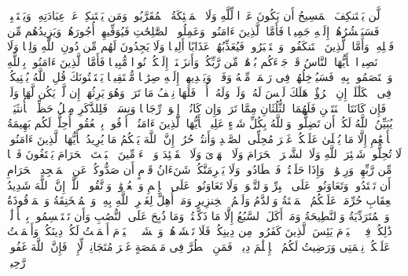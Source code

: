 \stopbuffer%
\startbuffer[\q:4:172]
لَّن یَسۡتَنكِفَ ٱلۡمَسِیحُ أَن یَكُونَ عَبۡدࣰا لِّلَّهِ وَلَا ٱلۡمَلَٰۤئِكَةُ ٱلۡمُقَرَّبُونَۚ وَمَن یَسۡتَنكِفۡ عَنۡ عِبَادَتِهِۦ وَیَسۡتَكۡبِرۡ فَسَیَحۡشُرُهُمۡ إِلَیۡهِ جَمِیعࣰا%
\stopbuffer%
\startbuffer[\q:4:173]
فَأَمَّا ٱلَّذِینَ ءَامَنُوا۟ وَعَمِلُوا۟ ٱلصَّٰلِحَٰتِ فَیُوَفِّیهِمۡ أُجُورَهُمۡ وَیَزِیدُهُم مِّن فَضۡلِهِۦۖ وَأَمَّا ٱلَّذِینَ ٱسۡتَنكَفُوا۟ وَٱسۡتَكۡبَرُوا۟ فَیُعَذِّبُهُمۡ عَذَابًا أَلِیمࣰا وَلَا یَجِدُونَ لَهُم مِّن دُونِ ٱللَّهِ وَلِیࣰّا وَلَا نَصِیرࣰا%
\stopbuffer%
\startbuffer[\q:4:174]
یَٰۤأَیُّهَا ٱلنَّاسُ قَدۡ جَاۤءَكُم بُرۡهَٰنࣱ مِّن رَّبِّكُمۡ وَأَنزَلۡنَاۤ إِلَیۡكُمۡ نُورࣰا مُّبِینࣰا%
\stopbuffer%
\startbuffer[\q:4:175]
فَأَمَّا ٱلَّذِینَ ءَامَنُوا۟ بِٱللَّهِ وَٱعۡتَصَمُوا۟ بِهِۦ فَسَیُدۡخِلُهُمۡ فِی رَحۡمَةࣲ مِّنۡهُ وَفَضۡلࣲ وَیَهۡدِیهِمۡ إِلَیۡهِ صِرَٰطࣰا مُّسۡتَقِیمࣰا%
\stopbuffer%
\startbuffer[\q:4:176]
یَسۡتَفۡتُونَكَ قُلِ ٱللَّهُ یُفۡتِیكُمۡ فِی ٱلۡكَلَٰلَةِۚ إِنِ ٱمۡرُؤٌا۟ هَلَكَ لَیۡسَ لَهُۥ وَلَدࣱ وَلَهُۥۤ أُخۡتࣱ فَلَهَا نِصۡفُ مَا تَرَكَۚ وَهُوَ یَرِثُهَاۤ إِن لَّمۡ یَكُن لَّهَا وَلَدࣱۚ فَإِن كَانَتَا ٱثۡنَتَیۡنِ فَلَهُمَا ٱلثُّلُثَانِ مِمَّا تَرَكَۚ وَإِن كَانُوۤا۟ إِخۡوَةࣰ رِّجَالࣰا وَنِسَاۤءࣰ فَلِلذَّكَرِ مِثۡلُ حَظِّ ٱلۡأُنثَیَیۡنِۗ یُبَیِّنُ ٱللَّهُ لَكُمۡ أَن تَضِلُّوا۟ۗ وَٱللَّهُ بِكُلِّ شَیۡءٍ عَلِیمُۢ%
\stopbuffer%
\startbuffer[\q:5:1]
یَٰۤأَیُّهَا ٱلَّذِینَ ءَامَنُوۤا۟ أَوۡفُوا۟ بِٱلۡعُقُودِۚ أُحِلَّتۡ لَكُم بَهِیمَةُ ٱلۡأَنۡعَٰمِ إِلَّا مَا یُتۡلَىٰ عَلَیۡكُمۡ غَیۡرَ مُحِلِّی ٱلصَّیۡدِ وَأَنتُمۡ حُرُمٌۗ إِنَّ ٱللَّهَ یَحۡكُمُ مَا یُرِیدُ%
\stopbuffer%
\startbuffer[\q:5:2]
یَٰۤأَیُّهَا ٱلَّذِینَ ءَامَنُوا۟ لَا تُحِلُّوا۟ شَعَٰۤئِرَ ٱللَّهِ وَلَا ٱلشَّهۡرَ ٱلۡحَرَامَ وَلَا ٱلۡهَدۡیَ وَلَا ٱلۡقَلَٰۤئِدَ وَلَاۤ ءَاۤمِّینَ ٱلۡبَیۡتَ ٱلۡحَرَامَ یَبۡتَغُونَ فَضۡلࣰا مِّن رَّبِّهِمۡ وَرِضۡوَٰنࣰاۚ وَإِذَا حَلَلۡتُمۡ فَٱصۡطَادُوا۟ۚ وَلَا یَجۡرِمَنَّكُمۡ شَنَءَانُ قَوۡمٍ أَن صَدُّوكُمۡ عَنِ ٱلۡمَسۡجِدِ ٱلۡحَرَامِ أَن تَعۡتَدُوا۟ۘ وَتَعَاوَنُوا۟ عَلَى ٱلۡبِرِّ وَٱلتَّقۡوَىٰۖ وَلَا تَعَاوَنُوا۟ عَلَى ٱلۡإِثۡمِ وَٱلۡعُدۡوَٰنِۚ وَٱتَّقُوا۟ ٱللَّهَۖ إِنَّ ٱللَّهَ شَدِیدُ ٱلۡعِقَابِ%
\stopbuffer%
\startbuffer[\q:5:3]
حُرِّمَتۡ عَلَیۡكُمُ ٱلۡمَیۡتَةُ وَٱلدَّمُ وَلَحۡمُ ٱلۡخِنزِیرِ وَمَاۤ أُهِلَّ لِغَیۡرِ ٱللَّهِ بِهِۦ وَٱلۡمُنۡخَنِقَةُ وَٱلۡمَوۡقُوذَةُ وَٱلۡمُتَرَدِّیَةُ وَٱلنَّطِیحَةُ وَمَاۤ أَكَلَ ٱلسَّبُعُ إِلَّا مَا ذَكَّیۡتُمۡ وَمَا ذُبِحَ عَلَى ٱلنُّصُبِ وَأَن تَسۡتَقۡسِمُوا۟ بِٱلۡأَزۡلَٰمِۚ ذَٰلِكُمۡ فِسۡقٌۗ ٱلۡیَوۡمَ یَئِسَ ٱلَّذِینَ كَفَرُوا۟ مِن دِینِكُمۡ فَلَا تَخۡشَوۡهُمۡ وَٱخۡشَوۡنِۚ ٱلۡیَوۡمَ أَكۡمَلۡتُ لَكُمۡ دِینَكُمۡ وَأَتۡمَمۡتُ عَلَیۡكُمۡ نِعۡمَتِی وَرَضِیتُ لَكُمُ ٱلۡإِسۡلَٰمَ دِینࣰاۚ فَمَنِ ٱضۡطُرَّ فِی مَخۡمَصَةٍ غَیۡرَ مُتَجَانِفࣲ لِّإِثۡمࣲ فَإِنَّ ٱللَّهَ غَفُورࣱ رَّحِیمࣱ%
